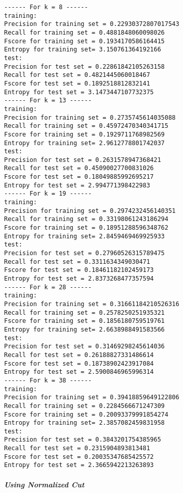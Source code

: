 \documentclass[11pt]{article}
\begin{document}
    \begin{Verbatim}[commandchars=\\\{\}]
------ For k = 8 ------
training:
Precision for training set = 0.22930372807017543
Recall for training set = 0.4881848060098026
Fscore for training set = 0.1934170586164415
Entropy for training set= 3.150761364192166
test:
Precision for test set = 0.22861842105263158
Recall for test set = 0.4821445060018467
Fscore for test set = 0.1892518812832141
Entropy for test set = 3.1473447107732375
------ For k = 13 ------
training:
Precision for training set = 0.2735745614035088
Recall for training set = 0.45972470340341715
Fscore for training set = 0.1929711768982569
Entropy for training set= 2.9612778801742037
test:
Precision for test set = 0.2631578947368421
Recall for test set = 0.45090027700831026
Fscore for test set = 0.18049885992695217
Entropy for test set = 2.994771398422983
------ For k = 19 ------
training:
Precision for training set = 0.2974232456140351
Recall for training set = 0.33198061243186294
Fscore for training set = 0.18951288596348762
Entropy for training set= 2.8459469469925933
test:
Precision for test set = 0.27960526315789475
Recall for test set = 0.3311634349030471
Fscore for test set = 0.18461182102459173
Entropy for test set = 2.8373268477357594
------ For k = 28 ------
training:
Precision for training set = 0.31661184210526316
Recall for training set = 0.2578250251935321
Fscore for training set = 0.1856180759519761
Entropy for training set= 2.6638988491583566
test:
Precision for test set = 0.31469298245614036
Recall for test set = 0.26188827331486614
Fscore for test set = 0.18738902423917084
Entropy for test set = 2.5900846965996314
------ For k = 38 ------
training:
Precision for training set = 0.39418859649122806
Recall for training set = 0.2284566671247309
Fscore for training set = 0.20093379991854274
Entropy for training set= 2.3857082459831958
test:
Precision for test set = 0.3843201754385965
Recall for test set = 0.2315904893813481
Fscore for test set = 0.20035347685425572
Entropy for test set = 2.3665942213263893
    \end{Verbatim}

    \subparagraph{Using Normalized Cut}\label{using-normalized-cut}
\end{document}
